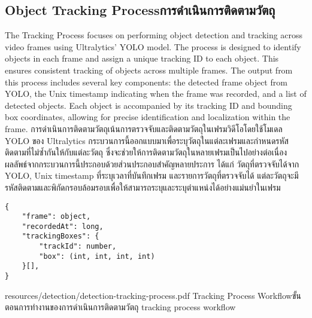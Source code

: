 \subsection{\ifenglish Object Tracking Process\else การดำเนินการติดตามวัตถุ\fi}
\ifenglish
The Tracking Process focuses on performing object detection and tracking across video frames using Ultralytics' YOLO model. The process is designed to identify objects in each frame and assign a unique tracking ID to each object. This ensures consistent tracking of objects across multiple frames. The output from this process includes several key components: the detected frame object from YOLO, the Unix timestamp indicating when the frame was recorded, and a list of detected objects. Each object is accompanied by its tracking ID and bounding box coordinates, allowing for precise identification and localization within the frame.
\else
การดำเนินการติดตามวัตถุเน้นการตรวจจับและติดตามวัตถุในเฟรมวิดีโอโดยใช้โมเดล YOLO ของ Ultralytics กระบวนการนี้ออกแบบมาเพื่อระบุวัตถุในแต่ละเฟรมและกำหนดรหัสติดตามที่ไม่ซ้ำกันให้กับแต่ละวัตถุ ซึ่งจะช่วยให้การติดตามวัตถุในหลายเฟรมเป็นไปอย่างต่อเนื่อง ผลลัพธ์จากกระบวนการนี้ประกอบด้วยส่วนประกอบสำคัญหลายประการ ได้แก่ วัตถุที่ตรวจจับได้จาก YOLO, Unix timestamp ที่ระบุเวลาที่บันทึกเฟรม และรายการวัตถุที่ตรวจจับได้ แต่ละวัตถุจะมีรหัสติดตามและพิกัดกรอบล้อมรอบเพื่อให้สามารถระบุและระบุตำแหน่งได้อย่างแม่นยำในเฟรม
\fi
\begin{lstlisting}
{
    "frame": object,
    "recordedAt": long,
    "trackingBoxes": {
        "trackId": number, 
        "box": (int, int, int, int) 
    }[],
}
\end{lstlisting}

\insertPDFfigure
{resources/detection/detection-tracking-process.pdf}
{\ifenglish Tracking Process Workflow\else ขั้นตอนการทำงานของการดำเนินการติดตามวัตถุ\fi}
{tracking process workflow}
